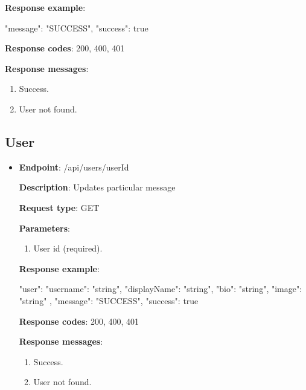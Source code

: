 \begin{itemize}
    \textbf{Response example}:

    \begin{spverbatim}
    {
        "message": "SUCCESS",
        "success": true
    }
    \end{spverbatim}

    \textbf{Response codes}: 200, 400, 401

    \textbf{Response messages}:
    \begin{enumerate}
        \item Success.
        \item User not found.
    \end{enumerate}

    \pagebreak
\end{itemize}

\subsection{User}\label{subsec:user}
\begin{itemize}
    \item \textbf{Endpoint}: /api/users/{userId}

    \textbf{Description}: Updates particular message

    \textbf{Request type}: GET

    \textbf{Parameters}:

    \begin{enumerate}
        \item User id (required).
    \end{enumerate}

    \textbf{Response example}:

    \begin{spverbatim}
    {
        "user": {
            "username": "string",
            "displayName": "string",
            "bio": "string",
            "image": "string"
        },
        "message": "SUCCESS",
        "success": true
    }
    \end{spverbatim}

    \textbf{Response codes}: 200, 400, 401

    \textbf{Response messages}:
    \begin{enumerate}
        \item Success.
        \item User not found.
    \end{enumerate}

    \pagebreak
\end{itemize}
